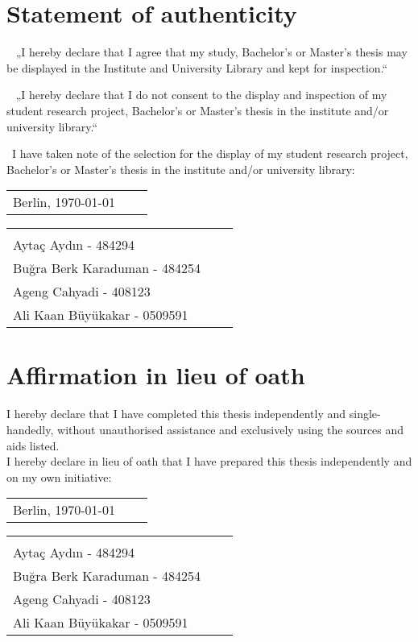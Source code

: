 \section*{Statement of authenticity}
\fancyfoot[R]{}
	\hspace{4mm}\Square~ „I hereby declare that I agree that my study, Bachelor's or Master's thesis may be displayed in the Institute and University Library and kept for inspection.“
	\vspace{1cm}
	
	\Square~ „I hereby declare that I do not consent to the display and inspection of my student research project, Bachelor's or Master's thesis in the institute and/or university library.“
	\vspace{1cm}
    
	\Square~I have taken note of the selection for the display of my student research project, Bachelor's or Master's thesis in the institute and/or university library:
\vspace{1cm}\\

\vspace{0.5 cm} 
\begin{tabular}{p{7cm}p{.5cm}l}
Berlin, {\today}
\end{tabular}%

\vspace{1,5 cm} 
\begin{tabular}{p{7cm}p{.5cm}l}
\dotfill \\ 
Aytaç Aydın - 484294 & \\
Buğra Berk Karaduman -  484254 & \\
Ageng Cahyadi - 408123 & \\
Ali Kaan Büyükakar - 0509591 & \\
[3ex]
\end{tabular}%
\newpage
\section*{Affirmation in lieu of oath}
\fancyfoot[R]{}
I hereby declare that I have completed this thesis independently and single-handedly, without unauthorised assistance and exclusively using the sources and aids listed.\\
I hereby declare in lieu of oath that I have prepared this thesis independently and on my own initiative:\\

\vspace{0.5 cm} 
\begin{tabular}{p{7cm}p{.5cm}l}
Berlin, {\today}
\end{tabular}%

\vspace{1,5 cm} 
\begin{tabular}{p{7cm}p{.5cm}l}
\dotfill \\ 
Aytaç Aydın - 484294 & \\
Buğra Berk Karaduman -  484254 & \\
Ageng Cahyadi - 408123 & \\
Ali Kaan Büyükakar - 0509591 & \\
\end{tabular}%




